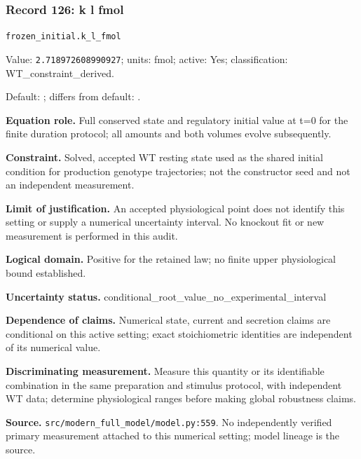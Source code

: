 \subsubsection*{Record 126: k l fmol}
{\small \nolinkurl{frozen_initial.k_l_fmol}\par

Value: \texttt{2.718972608990927}; units: fmol; active: Yes; classification: WT\_constraint\_derived.\par

Default: ; differs from default: .\par

\textbf{Equation role.} Full conserved state and regulatory initial value at t=0 for the finite duration protocol; all amounts and both volumes evolve subsequently.\par

\textbf{Constraint.} Solved, accepted WT resting state used as the shared initial condition for production genotype trajectories; not the constructor seed and not an independent measurement.\par

\textbf{Limit of justification.} An accepted physiological point does not identify this setting or supply a numerical uncertainty interval. No knockout fit or new measurement is performed in this audit.\par

\textbf{Logical domain.} Positive for the retained law; no finite upper physiological bound established.\par

\textbf{Uncertainty status.} conditional\_root\_value\_no\_experimental\_interval\par

\textbf{Dependence of claims.} Numerical state, current and secretion claims are conditional on this active setting; exact stoichiometric identities are independent of its numerical value.\par

\textbf{Discriminating measurement.} Measure this quantity or its identifiable combination in the same preparation and stimulus protocol, with independent WT data; determine physiological ranges before making global robustness claims.\par

\textbf{Source.} \nolinkurl{src/modern_full_model/model.py:559}. No independently verified primary measurement attached to this numerical setting; model lineage is the source.\par}


